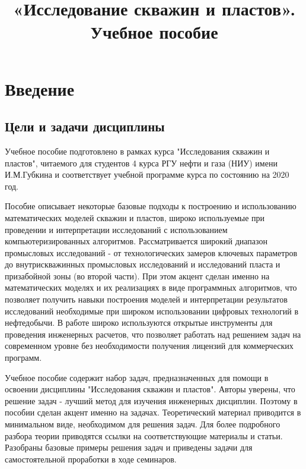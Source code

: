 \documentclass{memoir}
\begin{document}
\title{«Исследование скважин и пластов». Учебное пособие }

\maketitle

\tableofcontents{}
\chapter{Введение}

\section{Цели и задачи дисциплины}
Учебное пособие подготовлено в рамках курса "Исследования скважин и пластов", читаемого для студентов 4 курса РГУ нефти и газа (НИУ) имени И.М.Губкина и соответствует учебной программе курса по состоянию на 2020 год. 

Пособие описывает некоторые базовые подходы к построению и использованию математических моделей скважин и пластов, широко используемые при проведении и интерпретации исследований с использованием компьютеризированных алгоритмов. Рассматривается широкий диапазон промысловых исследований - от технологических замеров ключевых параметров до внутрискважинных промысловых исследований и исследований пласта и призабойной зоны (во второй части). При этом акцент сделан именно на математических моделях и их реализациях в виде программных алгоритмов, что позволяет получить навыки построения моделей и интерпретации результатов исследований необходимые при широком использовании цифровых технологий в нефтедобычи. В работе широко используются открытые инструменты для проведения инженерных расчетов, что позволяет работать над решением задач на современном уровне без необходимости получения лицензий для коммерческих программ. 

Учебное пособие содержит набор задач, предназначенных для помощи в освоении дисциплины "Исследования скважин и пластов". Авторы уверены, что решение задач - лучший метод для изучения инженерных дисциплин. Поэтому в пособии сделан акцент именно на задачах. Теоретический материал приводится в минимальном виде, необходимом для решения задач. Для более подробного разбора теории приводятся ссылки на соответствующие материалы и статьи. Разобраны базовые примеры решения задач и приведены задачи для самостоятельной проработки в ходе семинаров. 
\end{document}
